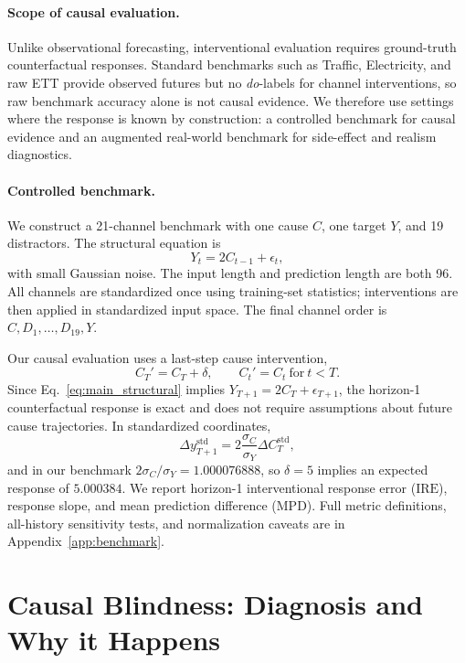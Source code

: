 \documentclass{article}
\newcommand{\ire}{\ensuremath{\mathrm{IRE}}}
\newcommand{\mpd}{\ensuremath{\mathrm{MPD}}}
\begin{document}
\paragraph{Scope of causal evaluation.}
Unlike observational forecasting, interventional evaluation requires ground-truth
counterfactual responses. Standard benchmarks such as Traffic, Electricity, and
raw ETT provide observed futures but no \emph{do}-labels for channel
interventions, so raw benchmark accuracy alone is not causal evidence. We therefore
use settings where the response is known by construction: a controlled benchmark
for causal evidence and an augmented real-world benchmark for side-effect and
realism diagnostics.

\paragraph{Controlled benchmark.}
We construct a 21-channel benchmark with one cause $C$, one target $Y$, and
19 distractors. The structural equation is
\begin{equation}
Y_t=2C_{t-1}+\epsilon_t ,
\label{eq:main_structural}
\end{equation}
with small Gaussian noise. The input length and prediction length are both 96.
All channels are standardized once using training-set statistics; interventions are
then applied in standardized input space. The final channel order is
$C,D_1,\ldots,D_{19},Y$.

Our causal evaluation uses a last-step cause intervention,
\begin{equation}
C_T' = C_T+\delta,\qquad C_t'=C_t \ \mathrm{for}\ t<T .
\end{equation}
Since Eq.~\eqref{eq:main_structural} implies
$Y_{T+1}=2C_T+\epsilon_{T+1}$, the horizon-1 counterfactual response is exact and
does not require assumptions about future cause trajectories. In standardized
coordinates,
\begin{equation}
\Delta y^{\mathrm{std}}_{T+1}
=2\frac{\sigma_C}{\sigma_Y}\Delta C_T^{\mathrm{std}},
\end{equation}
and in our benchmark $2\sigma_C/\sigma_Y=1.000076888$, so $\delta=5$ implies an
expected response of $5.000384$. We report horizon-1 interventional response error
(\ire), response slope, and mean prediction difference (\mpd). Full metric
definitions, all-history sensitivity tests, and normalization caveats are in
Appendix~\ref{app:benchmark}.

\section{Causal Blindness: Diagnosis and Why it Happens}
\label{sec:blindness}
\end{document}
